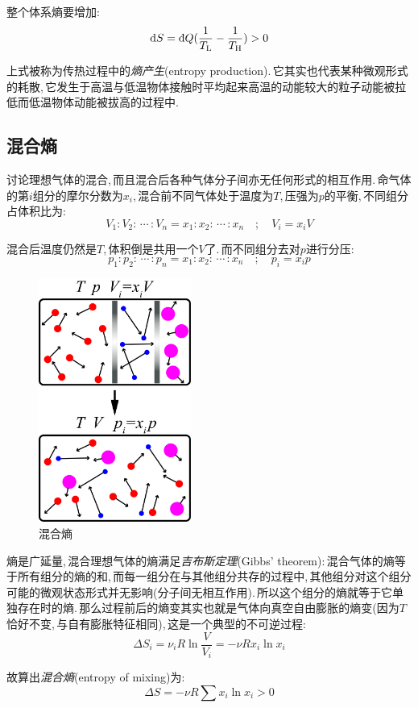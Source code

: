 整个体系熵要增加:
\[\ud S=\dbar Q(\frac{1}{T_{\rm L}}-\frac{1}{T_{\rm H}})> 0\]

上式被称为传热过程中的\emph{熵产生}(entropy production).\,它其实也代表某种微观形式的耗散,\,它发生于高温与低温物体接触时平均起来高温的动能较大的粒子动能被拉低而低温物体动能被拔高的过程中.

\subsection{混合熵}

讨论理想气体的混合,\,而且混合后各种气体分子间亦无任何形式的相互作用.\,命气体的第$i$组分的摩尔分数为$x_i$,\,混合前不同气体处于温度为$T$,\,压强为$p$的平衡,\,不同组分占体积比为:
\[V_1:V_2:\,\cdots\, :V_n=x_1:x_2:\,\cdots\,:x_n\quad ; \quad V_i=x_i V\]

混合后温度仍然是$T$,\,体积倒是共用一个$V$了.\,而不同组分去对$p$进行分压:
\[p_1:p_2:\,\cdots\, :p_n=x_1:x_2:\,\cdots\,:x_n\quad ; \quad p_i=x_i p\]

\begin{figure}
\centering
\vspace{-0.5cm}
\includegraphics[width=5cm]{image/5-2-16.png}
\caption{混合熵}
\end{figure}
熵是广延量,\,混合理想气体的熵满足\emph{吉布斯定理}(Gibbs' theorem):\,混合气体的熵等于所有组分的熵的和,\,而每一组分在与其他组分共存的过程中,\,其他组分对这个组分可能的微观状态形式并无影响(分子间无相互作用).\,所以这个组分的熵就等于它单独存在时的熵.\,那么过程前后的熵变其实也就是气体向真空自由膨胀的熵变(因为$T$恰好不变,\,与自有膨胀特征相同),\,这是一个典型的不可逆过程:
\[\Delta S_i=\nu_i R\ln\frac{V}{V_i}=-\nu R x_i\ln x_i\]

故算出\emph{混合熵}(entropy of mixing)为:
\[\Delta S=-\nu R\sum x_i\ln x_i>0\]

